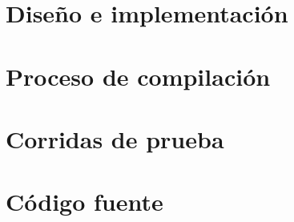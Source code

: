 \documentclass[11pt,a4paper]{article}
\begin{document}
		

	\setcounter{page}{1}
	\section{Diseño e implementación}	\label{sec:design}
		

	\section{Proceso de compilación} 	\label{sec:comp}
		

	\section{Corridas de prueba}
		
	
	\section{Código fuente}
		
\end{document}
